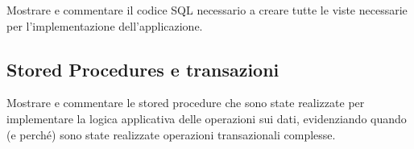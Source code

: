 \begin{templateblock}
    Mostrare e commentare il codice SQL necessario a creare tutte le viste
    necessarie per l’implementazione dell’applicazione.
\end{templateblock}

\subsection*{Stored Procedures e transazioni}

\begin{templateblock}
    Mostrare e commentare le stored procedure che sono state realizzate per
    implementare la logica applicativa delle operazioni sui dati, evidenziando
    quando (e perché) sono state realizzate operazioni transazionali complesse.
\end{templateblock}
